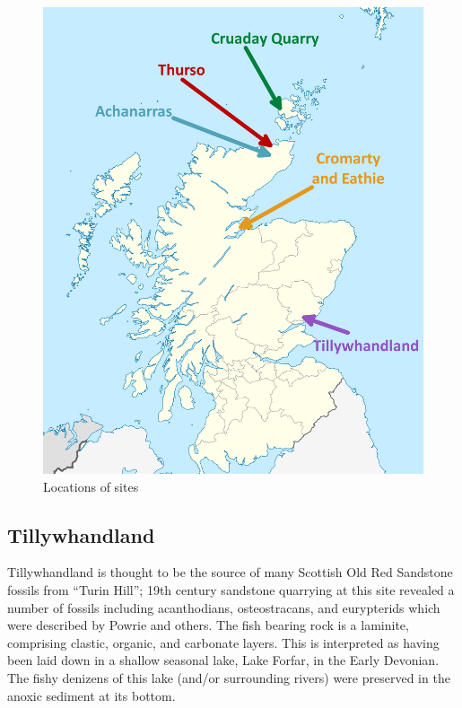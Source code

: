 \documentclass[12pt,letterpaper]{article}
\begin{document}
\begin{figure}[h!]
\caption{Locations of sites}
\includegraphics[scale=0.2]{Scotland_sites}
\centering
\end{figure}

\pagebreak

\subsection{Tillywhandland}

Tillywhandland is thought to be the source of many Scottish Old Red Sandstone fossils from ``Turin Hill''; 19th century sandstone quarrying at this site revealed a number of fossils including acanthodians, osteostracans, and eurypterids which were described by Powrie and others.  The fish bearing rock is a laminite, comprising clastic, organic, and carbonate layers.  This is interpreted as having been laid down in a shallow seasonal lake, Lake Forfar, in the Early Devonian.  The fishy denizens of this lake (and/or surrounding rivers) were preserved in the anoxic sediment at its bottom.\newline
\end{document}
